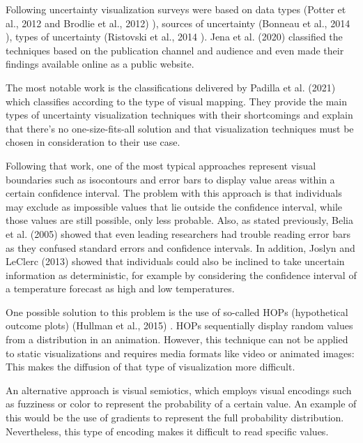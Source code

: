 \documentclass[a4paper,3p,sort&compress]{elsarticle}
\begin{document}
Following uncertainty visualization surveys were based on data types (Potter et
al., 2012 \cite{potter_quantification_2012} and Brodlie et al., 2012)
\cite{brodlie_review_2012}), sources of uncertainty (Bonneau et al., 2014
\cite{bonneau_overview_2014}), types of uncertainty (Ristovski et al., 2014
\cite{ristovski_uncertainty_2014}). Jena et al. (2020) \cite{jena_uncertainty_2020}
classified the techniques based on the publication channel and audience and even
made their findings available online as a public website.

The most notable work is the classifications delivered by Padilla et al. (2021)
\cite{padilla_uncertainty_2021} which classifies according to the type of visual
mapping. They provide the main types of uncertainty visualization techniques
with their shortcomings and explain that there's no one-size-fits-all solution
and that visualization techniques must be chosen in consideration to their use
case.

Following that work, one of the most typical approaches represent visual
boundaries such as isocontours and error bars to display value areas within a
certain confidence interval. The problem with this approach is that individuals
may exclude as impossible values that lie outside the confidence interval, while
those values are still possible, only less probable. Also, as stated previously,
Belia et al. (2005) \cite{belia_researchers_2005} showed that even leading researchers
had trouble reading error bars as they confused standard errors and confidence
intervals. In addition, Joslyn and LeClerc \cite{joslyn_decisions_2013} (2013) showed
that individuals could also be inclined to take uncertain information as
deterministic, for example by considering the confidence interval of a
temperature forecast as high and low temperatures.

One possible solution to this problem is the use of so-called HOPs (hypothetical
outcome plots) (Hullman et al., 2015) \cite{hullman_hypothetical_2015}. 
HOPs sequentially display random
values from a distribution in an animation. However, this technique can not be
applied to static visualizations and requires media formats like video or
animated images: This makes the diffusion of that type of visualization more
difficult.

An alternative approach is visual semiotics, which employs visual encodings such
as fuzziness or color to represent the probability of a certain value. An
example of this would be the use of gradients to represent the full probability
distribution. Nevertheless, this type of encoding makes it difficult to read
specific values.
\end{document}
